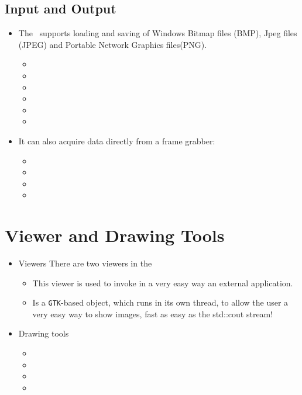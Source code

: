 \subsection{Input and Output}\label{inout}


\begin{itemize}
\item
The \ltilib\ supports loading and saving of Windows Bitmap files (BMP),  Jpeg files (JPEG) and Portable Network
Graphics files(PNG).
\begin{itemize}
\item
{}\item
{}\item
{}\item
{}\item
{}\item
{}\end{itemize}
\item
It can also acquire data directly from a frame grabber:\begin{itemize}
\item {}
\item {}
\item {}
\item {}
\end{itemize}
\end{itemize}
\section{Viewer and Drawing Tools}\label{draw}
\begin{itemize}
\item
Viewers There are two viewers in the \ltilib\:\begin{itemize}
\item {}\par This viewer
  is used to invoke in a very easy way an external application. \item
  \par Is a {\tt GTK}-based object,
  which runs in its own thread, to allow the user a very easy way to show
  images, fast as easy as the std::cout stream!\end{itemize}
\end{itemize}
\begin{itemize}
\item
Drawing tools\begin{itemize}
\item
{}\item
{}\item
{}\item
{}\end{itemize}
\end{itemize}
